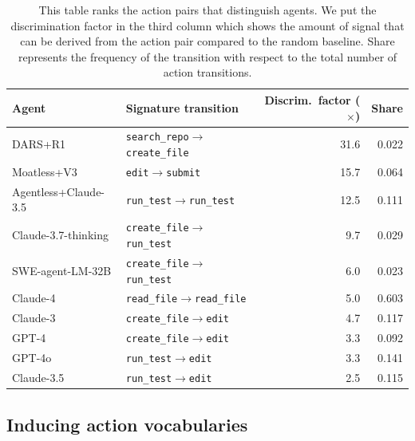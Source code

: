 \documentclass[11pt]{article}
\begin{document}
  \begin{table}[t]
  \centering\small
  \begin{tabular}{llrr}
  \toprule
  \textbf{Agent} & \textbf{Signature transition} & \textbf{Discrim.\ factor ($\times$)} & \textbf{Share} \\
  \midrule
  \rowcolor{owbg}     DARS+R1               & \texttt{search\_repo}$\to$\texttt{create\_file} & 31.6 & 0.022 \\
  \rowcolor{owbg}     Moatless+V3           & \texttt{edit}$\to$\texttt{submit}               & 15.7 & 0.064 \\
  \rowcolor{owbg}     Agentless+Claude-3.5  & \texttt{run\_test}$\to$\texttt{run\_test}       & 12.5 & 0.111 \\
  \rowcolor{claudebg} Claude-3.7-thinking   & \texttt{create\_file}$\to$\texttt{run\_test}    &  9.7 & 0.029 \\
  \rowcolor{owbg}     SWE-agent-LM-32B      & \texttt{create\_file}$\to$\texttt{run\_test}    &  6.0 & 0.023 \\
  \rowcolor{claudebg} Claude-4              & \texttt{read\_file}$\to$\texttt{read\_file}     &  5.0 & 0.603 \\
  \rowcolor{claudebg} Claude-3              & \texttt{create\_file}$\to$\texttt{edit}         &  4.7 & 0.117 \\
  \rowcolor{gptbg}    GPT-4                 & \texttt{create\_file}$\to$\texttt{edit}         &  3.3 & 0.092 \\
  \rowcolor{gptbg}    GPT-4o                & \texttt{run\_test}$\to$\texttt{edit}            &  3.3 & 0.141 \\
  \rowcolor{claudebg} Claude-3.5            & \texttt{run\_test}$\to$\texttt{edit}            &  2.5 & 0.115 \\
  \bottomrule
  \end{tabular}
  \caption{This table ranks the action pairs that distinguish agents. We put the discrimination factor in the third column which shows the
  amount of signal that can be derived from the action pair compared to the random baseline. Share represents the frequency of the transition
  with respect to the total number of action transitions.}
  \label{tab:signature_transitions}
  \end{table}


  \subsection{Inducing action vocabularies}
\end{document}
